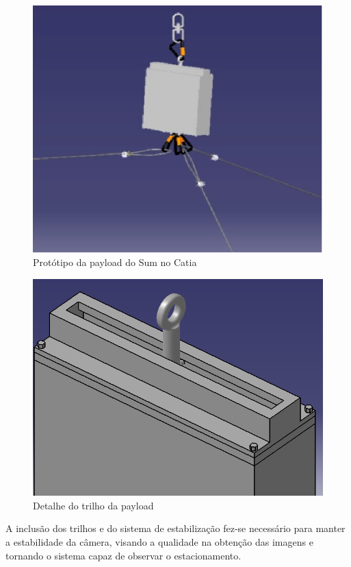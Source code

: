 \begin{figure}[htp]
	\centering
	\includegraphics[scale=0.50]{figuras/catiadopayload}
	\caption{Protótipo da payload do Sum no Catia}
	\label{img: Protótipo da payload do Sum no Catia}
	\end{figure}

\begin{figure}[htp]
	\centering
	\includegraphics[scale=0.50]{figuras/catiadafixacao}
	\caption{Detalhe do trilho da payload}
	\label{img: Detalhe do trilho da payload}
\end{figure}

A inclusão dos trilhos e do sistema de estabilização fez-se necessário para manter a estabilidade da câmera, visando a qualidade na obtenção das imagens e tornando o sistema capaz de observar o estacionamento.


